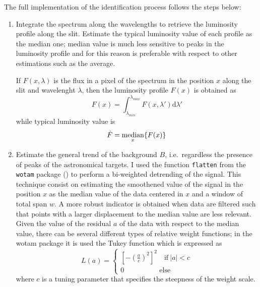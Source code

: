 The full implementation of the identification process follows the steps below:
\begin{enumerate}
	\item Integrate the spectrum along the wavelengths to retrieve the luminosity profile along the slit. Estimate the typical luminosity value of each profile as the median one; median value is much less sensitive to peaks in the luminosity profile and for this reason is preferable with respect to other estimations such as the average.
	
	If $F(x,\lambda)$ is the flux in a pixel of the spectrum in the position $x$ along the slit and wavelenght $\lambda$, then the luminosity profile $F(x)$ is obtained as
	\begin{equation}
		F(x)=\int_{\lambda_{min}}^{\lambda_{max}}F(x,\lambda')\text{d}\lambda'
	\end{equation}
	while typical luminosity value is
	\begin{equation}
		\hat F = \underset{x}{\text{median}}\large\{ F(x) \large\}
	\end{equation}
	\item Estimate the general trend of the background $B$, i.e.\ regardless the presence of peaks of the astronomical targets. I used the function \texttt{flatten} from the \texttt{wotam} package () to perform a bi-weighted detrending of the signal. This technique consist on estimating the smoothened value of the signal in the position $x$ as the median value of the data centered in $x$ and a window of total span $w$. A more robust indicator is obtained when data are filtered such that points with a larger displacement to the median value are less relevant. Given the value of the residual $a$ of the data with respect to the median value, there can be several different types of relative weight functions; in the wotam package it is used the Tukey function which is expressed as
	\begin{equation}
		L(a) = \begin{cases}
		\left[-\left(\frac{a}{c}\right)^2\right]^2\quad \text{if}\ | a| < c\\
		0\qquad\qquad\quad\text{else}
		\end{cases}
	\end{equation}
	where $c$ is a tuning parameter that specifies the steepness of the weight scale.
	

\end{enumerate}
